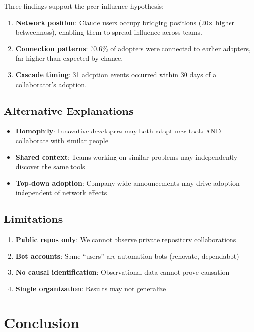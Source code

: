 \documentclass[11pt]{article}
\begin{document}
Three findings support the peer influence hypothesis:

\begin{enumerate}
    \item \textbf{Network position}: Claude users occupy bridging positions (20$\times$ higher betweenness), enabling them to spread influence across teams.

    \item \textbf{Connection patterns}: 70.6\% of adopters were connected to earlier adopters, far higher than expected by chance.

    \item \textbf{Cascade timing}: 31 adoption events occurred within 30 days of a collaborator's adoption.
\end{enumerate}

\subsection{Alternative Explanations}

\begin{itemize}
    \item \textbf{Homophily}: Innovative developers may both adopt new tools AND collaborate with similar people
    \item \textbf{Shared context}: Teams working on similar problems may independently discover the same tools
    \item \textbf{Top-down adoption}: Company-wide announcements may drive adoption independent of network effects
\end{itemize}

\subsection{Limitations}

\begin{enumerate}
    \item \textbf{Public repos only}: We cannot observe private repository collaborations
    \item \textbf{Bot accounts}: Some ``users'' are automation bots (renovate, dependabot)
    \item \textbf{No causal identification}: Observational data cannot prove causation
    \item \textbf{Single organization}: Results may not generalize
\end{enumerate}

\section{Conclusion}
\end{document}
